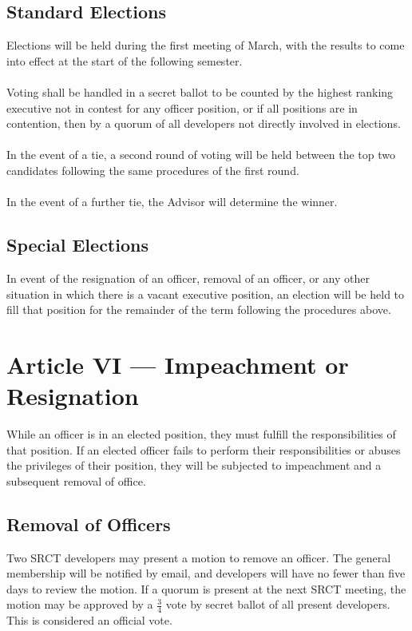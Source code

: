 \documentclass{article}
\begin{document}
  \subsection{Standard Elections}
  Elections will be held during the first meeting of March, with the
  results to come into effect at the start of the following semester.
  \\ \\
  Voting shall be handled in a secret ballot to be counted by the 
  highest ranking executive not in contest for any officer position, or if
  all positions are in contention, then by a quorum of all developers
  not directly involved in elections.
  \\ \\
  In the event of a tie, a second round of voting will be held between 
  the top two candidates following the same procedures of the first 
  round.
  \\ \\
  In the event of a further tie, the Advisor will determine the winner.
  
  \subsection{Special Elections}
  In event of the resignation of an officer, removal of an officer, or 
  any other situation in which there is a vacant executive position,
  an election will be held to fill that position for the remainder of 
  the term following the procedures above.


  \section{Article VI --- Impeachment or Resignation}
  While an officer is in an elected position, they must fulfill the 
  responsibilities of that position. If an elected officer fails to 
  perform their responsibilities or abuses the privileges of their 
  position, they will be subjected to impeachment and a subsequent 
  removal of office.
  
  \subsection{Removal of Officers}
  Two SRCT developers may present a motion to remove an officer. The general
  membership will be notified by email, and developers will have no fewer
  than five days to review the motion. If a quorum is present at the next
  SRCT meeting, the motion may be approved by a $\frac{3}{4}$ vote by secret 
  ballot of all present developers. This is considered an official vote.
\end{document}
